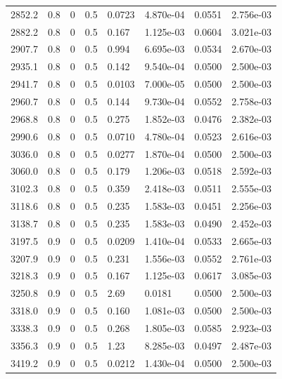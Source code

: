 \documentclass[preview]{standalone}
\begin{document}
{{{{\begin{tabular}{L{1.2cm}C{1.2cm} C{0.3cm}C{0.5cm} C{1.4cm}C{1.4cm} C{1.4cm}C{1.4cm}}
  2852.2  &   0.8  & 0     & 0.5 &  0.0723  & 4.870e-04  & 0.0551 &  2.756e-03   \\ 
  2882.2  &   0.8  & 0     & 0.5 &  0.167  & 1.125e-03  & 0.0604 &  3.021e-03   \\ 
  2907.7  &   0.8  & 0     & 0.5 &  0.994  & 6.695e-03  & 0.0534 &  2.670e-03   \\ 
  2935.1  &   0.8  & 0     & 0.5 &  0.142  & 9.540e-04  & 0.0500 &  2.500e-03   \\ 
  2941.7  &   0.8  & 0     & 0.5 &  0.0103  & 7.000e-05  & 0.0500 &  2.500e-03   \\ 
  2960.7  &   0.8  & 0     & 0.5 &  0.144  & 9.730e-04  & 0.0552 &  2.758e-03   \\ 
  2968.8  &   0.8  & 0     & 0.5 &  0.275  & 1.852e-03  & 0.0476 &  2.382e-03   \\ 
  2990.6  &   0.8  & 0     & 0.5 &  0.0710  & 4.780e-04  & 0.0523 &  2.616e-03   \\ 
  3036.0  &   0.8  & 0     & 0.5 &  0.0277  & 1.870e-04  & 0.0500 &  2.500e-03   \\ 
  3060.0  &   0.8  & 0     & 0.5 &  0.179  & 1.206e-03  & 0.0518 &  2.592e-03   \\ 
  3102.3  &   0.8  & 0     & 0.5 &  0.359  & 2.418e-03  & 0.0511 &  2.555e-03   \\ 
  3118.6  &   0.8  & 0     & 0.5 &  0.235  & 1.583e-03  & 0.0451 &  2.256e-03   \\ 
  3138.7  &   0.8  & 0     & 0.5 &  0.235  & 1.583e-03  & 0.0490 &  2.452e-03   \\ 
  3197.5  &   0.9  & 0     & 0.5 &  0.0209  & 1.410e-04  & 0.0533 &  2.665e-03   \\ 
  3207.9  &   0.9  & 0     & 0.5 &  0.231  & 1.556e-03  & 0.0552 &  2.761e-03   \\ 
  3218.3  &   0.9  & 0     & 0.5 &  0.167  & 1.125e-03  & 0.0617 &  3.085e-03   \\ 
  3250.8  &   0.9  & 0     & 0.5 &  2.69  & 0.0181  & 0.0500 &  2.500e-03   \\ 
  3318.0  &   0.9  & 0     & 0.5 &  0.160  & 1.081e-03  & 0.0500 &  2.500e-03   \\ 
  3338.3  &   0.9  & 0     & 0.5 &  0.268  & 1.805e-03  & 0.0585 &  2.923e-03   \\ 
  3356.3  &   0.9  & 0     & 0.5 &  1.23  & 8.285e-03  & 0.0497 &  2.487e-03   \\ 
  3419.2  &   0.9  & 0     & 0.5 &  0.0212  & 1.430e-04  & 0.0500 &  2.500e-03   \\ 

\end{tabular}}}}}
\end{document}
